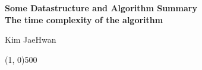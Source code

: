 \documentclass{article}%
\theoremstyle{definition}
\begin{document}
\begin{center}
    \textbf{\LARGE{Some Datastructure and Algorithm Summary} \\ \large{The time complexity of the algorithm}} \\
\end{center}

\begin{flushright}
    Kim JaeHwan
\end{flushright}

\begin{center}
    \par\noindent\line(1, 0){500}
\end{center}




    







\end{document}
